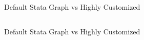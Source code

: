 \documentclass[shownotes,12pt, aspectratio=169]{beamer}
\begin{document}
\begin{frame}[t]{Default Stata Graph vs Highly Customized}
  \begin{columns}
  \begin{column}[T]{.5\textwidth}
    \begin{center}
\end{center}
  \end{column}
\end{columns}
\end{frame}
  \transreplace
  \begin{frame}[t]{Default Stata Graph vs Highly Customized}
  \begin{columns}
  \begin{column}[T]{.5\textwidth}
    \begin{center}
  \end{center}
  \end{column}
  \end{columns}

\end{frame}
\end{document}
